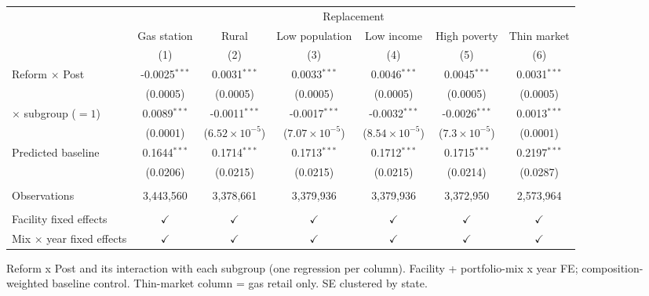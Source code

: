
\begingroup
\centering
\begin{tabular}{lcccccc}
   \toprule
    & \multicolumn{6}{c}{Replacement}\\
                                    & Gas station     & Rural                   & Low population          & Low income              & High poverty           & Thin market \\   
                                    & (1)             & (2)                     & (3)                     & (4)                     & (5)                    & (6)\\  
   \midrule 
   Reform $\times$ Post             & -0.0025$^{***}$ & 0.0031$^{***}$          & 0.0033$^{***}$          & 0.0046$^{***}$          & 0.0045$^{***}$         & 0.0031$^{***}$\\   
                                    & (0.0005)        & (0.0005)                & (0.0005)                & (0.0005)                & (0.0005)               & (0.0005)\\   
   \quad $\times$ subgroup ($=1$)   & 0.0089$^{***}$  & -0.0011$^{***}$         & -0.0017$^{***}$         & -0.0032$^{***}$         & -0.0026$^{***}$        & 0.0013$^{***}$\\   
                                    & (0.0001)        & ($6.52\times 10^{-5}$)  & ($7.07\times 10^{-5}$)  & ($8.54\times 10^{-5}$)  & ($7.3\times 10^{-5}$)  & (0.0001)\\   
   Predicted baseline               & 0.1644$^{***}$  & 0.1714$^{***}$          & 0.1713$^{***}$          & 0.1712$^{***}$          & 0.1715$^{***}$         & 0.2197$^{***}$\\   
                                    & (0.0206)        & (0.0215)                & (0.0215)                & (0.0215)                & (0.0214)               & (0.0287)\\   
    \\
   Observations                     & 3,443,560       & 3,378,661               & 3,379,936               & 3,379,936               & 3,372,950              & 2,573,964\\  
    \\
   Facility fixed effects           & $\checkmark$    & $\checkmark$            & $\checkmark$            & $\checkmark$            & $\checkmark$           & $\checkmark$\\   
   Mix $\times$ year fixed effects  & $\checkmark$    & $\checkmark$            & $\checkmark$            & $\checkmark$            & $\checkmark$           & $\checkmark$\\   
   \bottomrule
\end{tabular}
 
\par \raggedright 
Reform x Post and its interaction with each subgroup (one regression per column). Facility + portfolio-mix x year FE; composition-weighted baseline control. Thin-market column = gas retail only. SE clustered by state.
\par\endgroup


